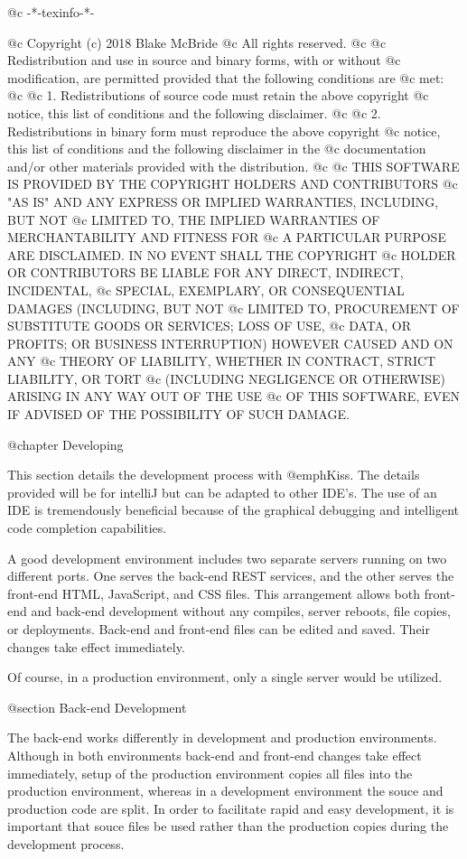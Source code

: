 @c -*-texinfo-*-

@c  Copyright (c) 2018 Blake McBride
@c  All rights reserved.
@c
@c  Redistribution and use in source and binary forms, with or without
@c  modification, are permitted provided that the following conditions are
@c  met:
@c
@c  1. Redistributions of source code must retain the above copyright
@c  notice, this list of conditions and the following disclaimer.
@c
@c  2. Redistributions in binary form must reproduce the above copyright
@c  notice, this list of conditions and the following disclaimer in the
@c  documentation and/or other materials provided with the distribution.
@c
@c  THIS SOFTWARE IS PROVIDED BY THE COPYRIGHT HOLDERS AND CONTRIBUTORS
@c  "AS IS" AND ANY EXPRESS OR IMPLIED WARRANTIES, INCLUDING, BUT NOT
@c  LIMITED TO, THE IMPLIED WARRANTIES OF MERCHANTABILITY AND FITNESS FOR
@c  A PARTICULAR PURPOSE ARE DISCLAIMED. IN NO EVENT SHALL THE COPYRIGHT
@c  HOLDER OR CONTRIBUTORS BE LIABLE FOR ANY DIRECT, INDIRECT, INCIDENTAL,
@c  SPECIAL, EXEMPLARY, OR CONSEQUENTIAL DAMAGES (INCLUDING, BUT NOT
@c  LIMITED TO, PROCUREMENT OF SUBSTITUTE GOODS OR SERVICES; LOSS OF USE,
@c  DATA, OR PROFITS; OR BUSINESS INTERRUPTION) HOWEVER CAUSED AND ON ANY
@c  THEORY OF LIABILITY, WHETHER IN CONTRACT, STRICT LIABILITY, OR TORT
@c  (INCLUDING NEGLIGENCE OR OTHERWISE) ARISING IN ANY WAY OUT OF THE USE
@c  OF THIS SOFTWARE, EVEN IF ADVISED OF THE POSSIBILITY OF SUCH DAMAGE.


@chapter Developing

This section details the development process with @emph{Kiss}.  The
details provided will be for intelliJ but can be adapted to other
IDE's.  The use of an IDE is tremendously beneficial because of the
graphical debugging and intelligent code completion capabilities.

A good development environment includes two separate servers running
on two different ports.  One serves the back-end REST services, and
the other serves the front-end HTML, JavaScript, and CSS files.  This
arrangement allows both front-end and back-end development without any
compiles, server reboots, file copies, or deployments.  Back-end and
front-end files can be edited and saved.  Their changes take effect
immediately.

Of course, in a production environment, only a single server would be
utilized.

@section Back-end Development

The back-end works differently in development and production
environments.  Although in both environments back-end and front-end
changes take effect immediately, setup of the production environment
copies all files into the production environment, whereas in a
development environment the souce and production code are split.  In
order to facilitate rapid and easy development, it is important that
souce files be used rather than the production copies during the
development process.

